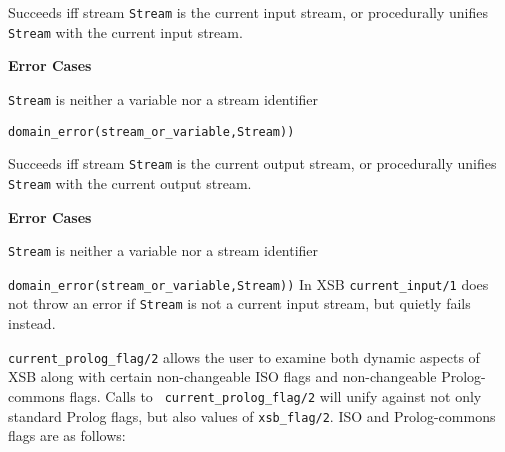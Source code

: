 \begin{description}

    Succeeds iff stream {\tt Stream} is the current input stream, or 
    procedurally unifies {\tt Stream} with the current input stream.

{\bf Error Cases}
\bi
\item 	{\tt Stream} is neither a variable nor a stream identifier
\bi
\item 	{\tt domain\_error(stream\_or\_variable,Stream))}
\ei
\ei
%
%

%
    Succeeds iff stream {\tt Stream} is the current output stream, or 
    procedurally unifies {\tt Stream} with the current output stream.

{\bf Error Cases}
\bi
\item 	{\tt Stream} is neither a variable nor a stream identifier
\bi
\item 	{\tt domain\_error(stream\_or\_variable,Stream))}
\ei
\ei
%
\compatability 
%
In XSB {\tt current\_input/1} does not throw an error if {\tt Stream}
is not a current input stream, but quietly fails instead.

%
{\tt current\_prolog\_flag/2} allows the user to examine both dynamic
aspects of XSB along with certain non-changeable ISO flags and
non-changeable Prolog-commons flags.  Calls to {\tt
  current\_prolog\_flag/2} will unify against not only standard Prolog
flags, but also values of {\tt xsb\_flag/2}.  ISO and Prolog-commons
flags are as follows:


\end{description}
